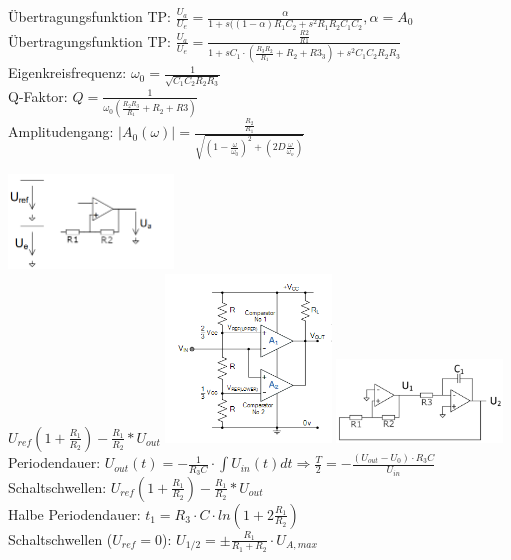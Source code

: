\documentclass[A4]{scrartcl}
\begin{document}
  Übertragungsfunktion TP: $\frac{U_a}{U_e} = \frac{\alpha}{1+s((1-\alpha)R_1C_2+s^2R_1R_2C_1C_2}, \alpha = A_0$\\
  
  Übertragungsfunktion TP: $\frac{U_a}{U_e} = \frac{\frac{R2}{R1}}{1+sC_1\cdot (\frac{R_3 R_2}{R_1} + R_2 + R3_3) + s^2C_1C_2R_2R_3 }$\\
  Eigenkreisfrequenz: $\omega_0 = \frac{1}{\sqrt{C_1C_2R_2R_3}}$\\
  Q-Faktor: $Q = \frac{1}{\omega_0 (\frac{R_2R_3}{R_1}+R_2+R3)}$\\
  Amplitudengang: $|A_0(\omega)| = \frac{\frac{R_2}{R_1}}{\sqrt{(1-\frac{\omega}{\omega_0})^2+(2D\frac{\omega}{\omega_o})}}$

  \includegraphics[width=0.33\textwidth]{Komparator.png}\\
  $U_{ref}(1+\frac{R_1}{R_2})-\frac{R_1}{R_2}*U_{out}$
  \includegraphics[width=0.33\textwidth]{Fensterkomparator.png}
  \includegraphics[width=0.33\textwidth]{Rechteck_Dreieck_Generator.png}\\
  Periodendauer: $U_{out}(t) = -\frac{1}{R_3C}\cdot\int U_{in}(t)dt \Rightarrow \frac{T}{2} = -\frac{(U_{out}-U_0)\cdot R_3C}{U_{in}}$\\
  Schaltschwellen: $U_{ref}(1+\frac{R_1}{R_2})-\frac{R_1}{R_2}*U_{out}$\\
  Halbe Periodendauer: $t_1 = R_3 \cdot C \cdot ln(1+2\frac{R_1}{R_2})$\\
  Schaltschwellen ($U_{ref} = 0$): $U_{1/2} = \pm \frac{R_1}{R_1+R_2} \cdot U_{A, max}$\\
  
\end{document}
